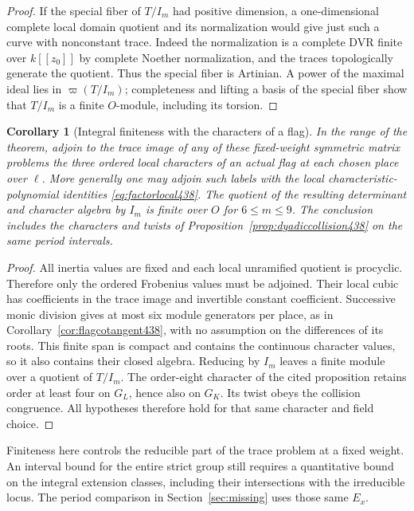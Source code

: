 \documentclass[a4paper,11pt]{article}
\newtheorem{corollary}[proposition]{Corollary}
\theoremstyle{definition}
\theoremstyle{remark}
\numberwithin{equation}{section}
\begin{document}
\begin{proof}
If the special fiber of \(T/I_m\) had positive dimension, a
one-dimensional complete local domain quotient and its
normalization would give just such a curve with nonconstant
trace. Indeed the normalization is a complete DVR finite
over \(k[[z_0]]\) by complete Noether normalization, and
the traces topologically generate the quotient. Thus the
special fiber is Artinian. A power of the maximal ideal
lies in \(\varpi(T/I_m)\); completeness and lifting a basis
of the special fiber show that \(T/I_m\) is a finite
\(O\)-module, including its torsion.
\end{proof}

\begin{corollary}[Integral finiteness with the characters of a flag]\leavevmode
\label{cor:flagfinitered439}
In the range of the theorem, adjoin to the trace image of
any of these fixed-weight symmetric matrix problems the
three ordered local characters of an actual flag at each
chosen place over \(\ell\). More generally one may adjoin
such labels with the local characteristic-polynomial
identities \eqref{eq:factorlocal438}. The quotient of the
resulting determinant and character algebra by \(I_m\) is
finite over \(O\) for \(6\le m\le9\). The conclusion includes
the characters and twists of Proposition~\ref{prop:dyadiccollision438}
on the same period intervals.
\end{corollary}
\begin{proof}
All inertia values are fixed and each local unramified
quotient is procyclic. Therefore only the ordered Frobenius
values must be adjoined. Their local cubic has coefficients
in the trace image and invertible constant coefficient.
Successive monic division gives at most six module generators
per place, as in Corollary~\ref{cor:flagcotangent438}, with
no assumption on the differences of its roots. This finite
span is compact and contains the continuous character
values, so it also contains their closed algebra. Reducing
by \(I_m\) leaves a finite module over a quotient of \(T/I_m\).
The order-eight character of the cited proposition retains
order at least four on \(G_L\), hence also on \(G_K\).
Its twist obeys the collision congruence. All hypotheses
therefore hold for that same character and field choice.
\end{proof}

Finiteness here controls the reducible part of the trace
problem at a fixed weight. An interval bound for the entire
strict group still requires a quantitative bound on the
integral extension classes, including their intersections with
the irreducible locus. The period comparison in
Section~\ref{sec:missing} uses those same \(E_x\).
\end{document}
